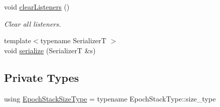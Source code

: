 \begin{DoxyCompactItemize}
void \hyperlink{structvt_1_1messaging_1_1_active_messenger_af7bcc5ce345c1138a67b6f80abb56705}{clear\+Listeners} ()
\begin{DoxyCompactList}\small\item\em Clear all listeners. \end{DoxyCompactList}\item 
{\footnotesize template$<$typename SerializerT $>$ }\\void \hyperlink{structvt_1_1messaging_1_1_active_messenger_aaf97f035a1f144599523144a9abeaf0e}{serialize} (SerializerT \&s)
\end{DoxyCompactItemize}
\subsection*{Private Types}
\begin{DoxyCompactItemize}
\item 
using \hyperlink{structvt_1_1messaging_1_1_active_messenger_a447c6c0b3387142fd14b26c12e3ed877}{Epoch\+Stack\+Size\+Type} = typename Epoch\+Stack\+Type\+::size\+\_\+type
\end{DoxyCompactItemize}
